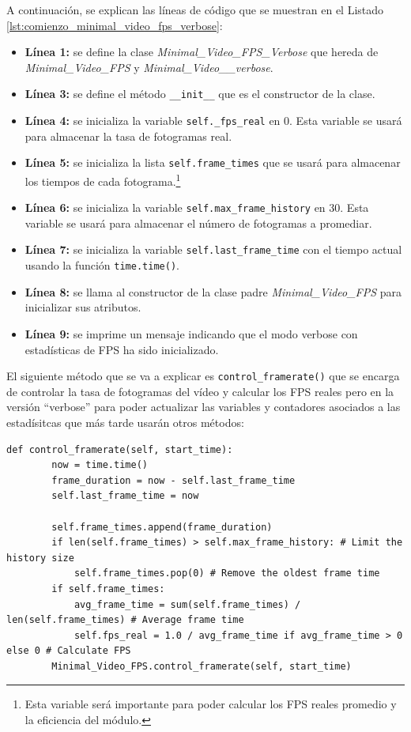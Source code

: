 A continuación, se explican las líneas de código que se muestran en el Listado \ref{lst:comienzo_minimal_video_fps_verbose}:
\begin{itemize}
    \item \textbf{Línea 1:} se define la clase \textit{Minimal\_Video\_FPS\_Verbose} que hereda de \textit{Minimal\_Video\_FPS} y \textit{Minimal\_Video\_\_verbose}.
    \item \textbf{Línea 3:} se define el método \texttt{\_\_init\_\_} que es el constructor de la clase.
    \item \textbf{Línea 4:} se inicializa la variable \texttt{self.\_fps\_real} en 0. Esta variable se usará para almacenar la tasa de fotogramas real.
    \item \textbf{Línea 5:} se inicializa la lista \texttt{self.frame\_times} que se usará para almacenar los tiempos de cada fotograma.\footnote{Esta variable será importante para poder calcular los FPS reales promedio y la eficiencia del módulo.}
    \item \textbf{Línea 6:} se inicializa la variable \texttt{self.max\_frame\_history} en 30. Esta variable se usará para almacenar el número de fotogramas a promediar.
    \item \textbf{Línea 7:} se inicializa la variable \texttt{self.last\_frame\_time} con el tiempo actual usando la función \texttt{time.time()}.
    \item \textbf{Línea 8:} se llama al constructor de la clase padre \textit{Minimal\_Video\_FPS} para inicializar sus atributos.
    \item \textbf{Línea 9:} se imprime un mensaje indicando que el modo verbose con estadísticas de FPS ha sido inicializado.
\end{itemize}
\vspace{\baselineskip}

El siguiente método que se va a explicar es \texttt{control\_framerate()} que se encarga de controlar la tasa de fotogramas del vídeo y calcular los FPS reales pero en la versión ``verbose'' para poder actualizar las variables y contadores asociados a las estadísitcas que más tarde usarán otros métodos:
\begin{lstlisting}[style=pythonstyle, caption={Método \texttt{control\_framerate()} de \textit{Minimal\_Video\_FPS}.}, label={lst:control_framerate_minimal_video_fps_verbose}]
def control_framerate(self, start_time):
        now = time.time()
        frame_duration = now - self.last_frame_time
        self.last_frame_time = now

        self.frame_times.append(frame_duration)
        if len(self.frame_times) > self.max_frame_history: # Limit the history size
            self.frame_times.pop(0) # Remove the oldest frame time
        if self.frame_times:
            avg_frame_time = sum(self.frame_times) / len(self.frame_times) # Average frame time
            self.fps_real = 1.0 / avg_frame_time if avg_frame_time > 0 else 0 # Calculate FPS
        Minimal_Video_FPS.control_framerate(self, start_time)
\end{lstlisting}
\vspace{\baselineskip}

